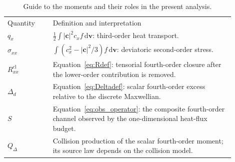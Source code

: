 \documentclass[lineno,paper]{JFM-FLM_Au}
\newcommand{\revisionbox}[1]{\colorbox{revisionyellow}{#1}}
\newcommand{\revisionbox}[1]{#1}
\newcommand{\dd}{\mathrm{d}}
\newcommand{\cl}{\mathrm{cl}}
\begin{document}
\begin{table}
\centering
\revisionbox{\begin{minipage}{0.92\textwidth}\captionsetup{width=\linewidth}
\caption{Guide to the moments and their roles in the present analysis.}
\label{tab:revision_moment_guide}
\small
\begin{tabular}{p{0.18\linewidth}p{0.72\linewidth}}
Quantity & Definition and interpretation\\[3pt]
$q_x$ & $\frac12\int |\boldsymbol c|^2c_xf\,\dd\boldsymbol v$: third-order heat transport.\\[3pt]
$\sigma_{xx}$ & $\int(c_x^2-|\boldsymbol c|^2/3)f\,\dd\boldsymbol v$: deviatoric second-order stress.\\[3pt]
$R^{\cl}_{xx}$ & Equation~\eqref{eq:Rdef}: tensorial fourth-order closure after the lower-order contribution is removed.\\[3pt]
$\Delta_d$ & Equation~\eqref{eq:Deltadef}: scalar fourth-order excess relative to the discrete Maxwellian.\\[3pt]
$S$ & Equation~\eqref{eq:obs_operator}: the composite fourth-order channel observed by the one-dimensional heat-flux budget.\\[3pt]
$Q_\Delta$ & Collision production of the scalar fourth-order moment; its source law depends on the collision model.\\
\end{tabular}
\end{minipage}}\par
\end{table}
\end{document}
